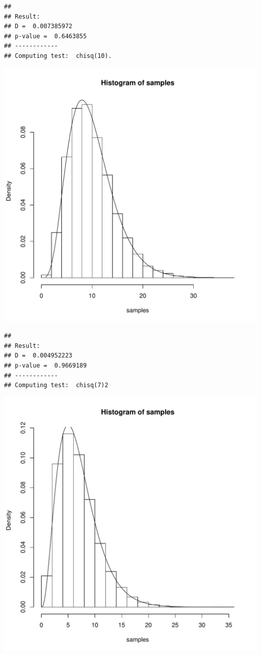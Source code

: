 \documentclass{llncs}\usepackage[]{graphicx}\usepackage[]{color}
\makeatletter
\def\maxwidth{ %
  \ifdim\Gin@nat@width>\linewidth
    \linewidth
  \else
    \Gin@nat@width
  \fi
}
\newenvironment{kframe}{%
 \def\at@end@of@kframe{}%
 \ifinner\ifhmode%
  \def\at@end@of@kframe{\end{minipage}}%
  \begin{minipage}{\columnwidth}%
 \fi\fi%
 \def\FrameCommand##1{\hskip\@totalleftmargin \hskip-\fboxsep
 \colorbox{shadecolor}{##1}\hskip-\fboxsep
     \hskip-\linewidth \hskip-\@totalleftmargin \hskip\columnwidth}%
 \MakeFramed {\advance\hsize-\width
   \@totalleftmargin\z@ \linewidth\hsize
   \@setminipage}}%
 {\par\unskip\endMakeFramed%
 \at@end@of@kframe}
\newenvironment{knitrout}{}{} %
\makeatother
\begin{document}
\begin{knitrout}
\begin{kframe}\begin{lstlisting}[basicstyle=\ttfamily,breaklines=true]
## 
## Result:
## D =  0.007385972 
## p-value =  0.6463855 
## ------------
## Computing test:  chisq(10).
\end{lstlisting}
\end{kframe}
\includegraphics[width=\maxwidth]{figure/Rt-8} 
\begin{kframe}\begin{lstlisting}[basicstyle=\ttfamily,breaklines=true]
## 
## Result:
## D =  0.004952223 
## p-value =  0.9669189 
## ------------
## Computing test:  chisq(7)2
\end{lstlisting}
\end{kframe}
\includegraphics[width=\maxwidth]{figure/Rt-9} 

\end{knitrout}
\end{document}
